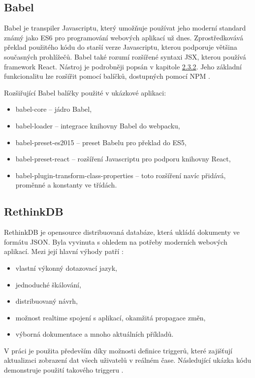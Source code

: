 \subsection{Babel}
Babel je transpiler Javascriptu, který umožňuje používat jeho moderní standard známý jako ES6 pro programování webových aplikací už dnes. Zprostředkovává překlad použitého kódu do starší verze Javascriptu, kterou podporuje většina současných prohlížečů. Babel také rozumí rozšířené syntaxi JSX, kterou používá framework React. Nástroj je podrobněji popsán v kapitole \hyperref[sec:babel]{2.3.2}. Jeho základní funkcionalitu lze rozšířit pomocí balíčků, dostupných pomocí NPM \cite{babel}.

\vspace{3mm}
\noindent Rozšiřující Babel balíčky použité v ukázkové aplikaci:
\begin{itemize}
\item babel-core – jádro Babel,
\item babel-loader – integrace knihovny Babel do webpacku,
\item babel-preset-es2015 – preset Babelu pro překlad do ES5,
\item babel-preset-react – rozšíření Javascriptu pro podporu knihovny React,
\item babel-plugin-transform-class-properties – toto rozšíření navíc přidává, proměnné a konstanty ve třídách.
\end{itemize}

\subsection{RethinkDB}
\label{sec:rethinkdb}
RethinkDB je opensource distribuovaná databáze, která ukládá dokumenty ve formátu JSON. Byla vyvinuta s ohledem na potřeby moderních webových aplikací. Mezi její hlavní výhody patří \cite{rethinkdb}: 

\begin{itemize}
\item vlastní výkonný dotazovací jazyk,
\item jednoduché škálování,
\item distribuovaný návrh,
\item možnost realtime spojení s aplikací, okamžitá propagace změn,
\item výborná dokumentace a mnoho aktuálních příkladů.
\end{itemize}

V práci je použita především díky možnosti definice triggerů, které zajišťují aktualizaci zobrazení dat všech uživatelů v reálném čase. Následující ukázka kódu demonstruje použití takového triggeru \cite{rethinkdb}.

